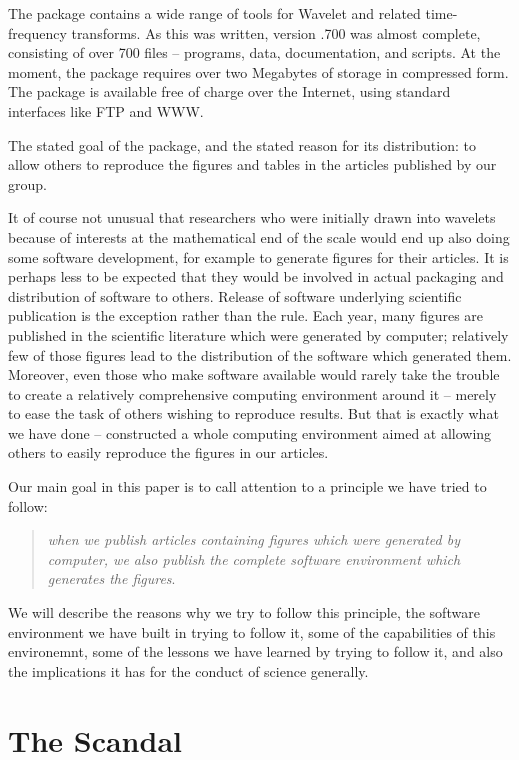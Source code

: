 The \WaveLab package contains a wide range of tools for Wavelet and
related time-frequency transforms.  As this was written, version .700 was
almost complete, consisting of over 700 files -- programs, data, documentation,
and scripts. At the moment, the package requires over two Megabytes of storage
in compressed form.  The package is available free of
charge over the Internet, using standard interfaces like FTP and WWW.

The stated goal of the package, and the stated reason for its distribution:
to allow others to reproduce the figures and tables in the articles published
by our group.

It of course not unusual that researchers who were initially drawn into wavelets because of
interests at the mathematical end of the scale would end up also doing some software
development, for example to generate figures for their articles.  It is perhaps less to be
expected that they would be involved in actual packaging and distribution of software to
others.  Release of software underlying scientific publication is the exception rather than
the rule. Each year, many figures are published in the scientific literature which were
generated by computer; relatively few of those figures lead to the distribution of the
software which generated them.  Moreover, even those who make software available
would rarely take the trouble to create a relatively comprehensive computing environment
around it -- merely to ease the task of others wishing to reproduce results.  But that
is exactly what we have done -- constructed a whole computing environment aimed
at allowing others to easily reproduce the figures in our articles. 

Our main goal in this paper is to call attention to a principle we have tried to follow: 
\begin{quote}
{\it when we publish articles containing figures which were generated by computer, we
also publish the complete software environment which generates the figures}.
\end{quote}
We will describe the reasons why we
try to follow this principle, the software environment \WaveLab
we have built in trying to follow it, some of the
capabilities of this environemnt, some of the
lessons we have learned by trying to follow it,
and also the implications it has for the conduct of science generally.   

\section{The Scandal}

